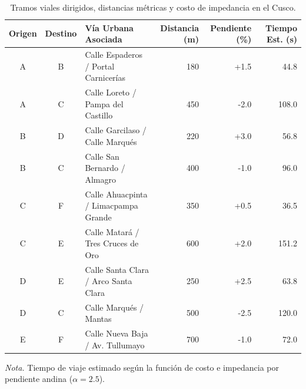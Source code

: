 \begin{table}[H]
    \centering
    \fontsize{10}{12.5}\selectfont
    \setlength{\tabcolsep}{4pt}
    \caption{Tramos viales dirigidos, distancias métricas y costo de impedancia en el Cusco.}
    \label{tab:aristas_cusco}
    \begin{tabularx}{\textwidth}{@{}ccXrrr@{}}
        \toprule
        \textbf{Origen} & \textbf{Destino} & \textbf{Vía Urbana Asociada} & \textbf{Distancia (m)} & \textbf{Pendiente (\%)} & \textbf{Tiempo Est. (s)} \\
        \midrule
        A & B & Calle Espaderos / Portal Carnicerías & 180 & +1.5 & 44.8 \\
        A & C & Calle Loreto / Pampa del Castillo & 450 & -2.0 & 108.0 \\
        B & D & Calle Garcilaso / Calle Marqués & 220 & +3.0 & 56.8 \\
        B & C & Calle San Bernardo / Almagro & 400 & -1.0 & 96.0 \\
        C & F & Calle Ahuacpinta / Limacpampa Grande & 350 & +0.5 & 36.5 \\
        C & E & Calle Matará / Tres Cruces de Oro & 600 & +2.0 & 151.2 \\
        D & E & Calle Santa Clara / Arco Santa Clara & 250 & +2.5 & 63.8 \\
        D & C & Calle Marqués / Mantas & 500 & -2.5 & 120.0 \\
        E & F & Calle Nueva Baja / Av. Tullumayo & 700 & -1.0 & 72.0 \\
        \bottomrule
    \end{tabularx}
    \par\vspace{0.15cm}
    \raggedright
    \textit{Nota.} Tiempo de viaje estimado según la función de costo e impedancia por pendiente andina ($\alpha = 2.5$).
\end{table}
